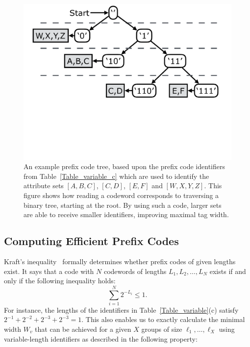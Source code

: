 \begin{figure}[t!] 
\begin{minipage}{1\linewidth}
\includegraphics[trim={0 10cm 0 0}, clip, width=\linewidth]{figures/code_tree}
\end{minipage} 
\caption{An example prefix code tree, based upon the prefix code identifiers from Table~\ref{Table_variable_c} which are used to identify the attribute sets $[A,B,C]$, $[C,D]$, $[E,F]$ and $[W,X,Y,Z]$. This figure shows how reading a codeword corresponds to traversing a binary tree, starting at the root. By using such a code, larger sets are able to receive smaller identifiers, improving maximal  tag width.}
\label{fig:code_tree}
\end{figure}

\subsection{Computing Efficient Prefix Codes}
Kraft's inequality~\cite{abramson} formally determines whether prefix
codes of given lengths exist.  It says that a code with $N$ codewords
of lengths $L_1, L_2, \ldots, L_N$ exists if and only if the following
inequality holds:
$$ \sum_{i = 1}^{N}{2^{-L_i}} \le 1. $$
%
For instance, the lengths of the identifiers in
Table~\ref{Table_variable}(c) 
satisfy $2^{-1} + 2^{-2} + 2^{-3} + 2^{-3} = 1$.
%
This also enables us to exactly calculate the minimal width $W_{v}$
that can be achieved for a given $X$ groups of size $\ell_1,
\ldots, \ell_X$ using variable-length identifiers as described in the
following property:

